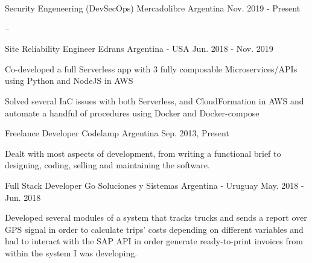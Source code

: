 

\begin{cventries}
\cventry
{Security Engeneering (DevSecOps)} %
{Mercadolibre} %
{Argentina} %
{Nov. 2019 - Present} %
{
\begin{cvitems} %
\item {--}
\end{cvitems}
}

\cventry
{Site Reliability Engineer} %
{Edrans} %
{Argentina - USA} %
{Jun. 2018 - Nov. 2019} %
{
\begin{cvitems} %
\item {Co-developed a full Serverless app with 3 fully composable Microservices/APIs using Python and NodeJS in AWS}
\item {Solved several IaC issues with both Serverless, and CloudFormation in AWS and automate a handful of procedures using Docker and Docker-compose}
\end{cvitems}
}

\cventry
{Freelance Developer} %
{Codelamp} %
{Argentina} %
{Sep. 2013, Present} %
{
\begin{cvitems}
    \item {Dealt with most aspects of development, from writing a functional brief to designing, coding, selling and maintaining the software.}
\end{cvitems}
}

\cventry
{Full Stack Developer} %
{Go Soluciones y Sistemas} %
{Argentina - Uruguay} %
{May. 2018 - Jun. 2018} %
{
\begin{cvitems} %
\item {Developed several modules of a system that tracks trucks and sends a report over GPS signal in order to calculate trips' costs depending on different variables and had to interact with the SAP API in order generate ready-to-print invoices from within the system I was developing.}
\end{cvitems}
}


\end{cventries}
